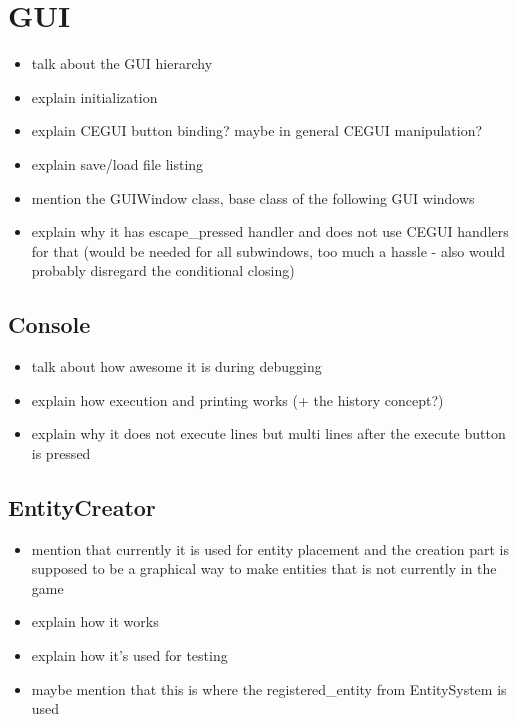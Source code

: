 \section{GUI}

\begin{itemize}
    \item talk about the GUI hierarchy
    \item explain initialization
    \item explain CEGUI button binding? maybe in general CEGUI manipulation?
    \item explain save/load file listing
    \item mention the GUIWindow class, base class of the following GUI windows
    \item explain why it has escape\_pressed handler and does not use CEGUI handlers
        for that (would be needed for all subwindows, too much a hassle - also would
        probably disregard the conditional closing)
\end{itemize}

\subsection{Console}

\begin{itemize}
    \item talk about how awesome it is during debugging
    \item explain how execution and printing works (+ the history concept?)
    \item explain why it does not execute lines but multi lines after the execute
        button is pressed
\end{itemize}

\subsection{EntityCreator}

\begin{itemize}
    \item mention that currently it is used for entity placement and
        the creation part is supposed to be a graphical way to make entities that
        is not currently in the game
    \item explain how it works
    \item explain how it's used for testing
    \item maybe mention that this is where the registered\_entity from EntitySystem
        is used
\end{itemize}

